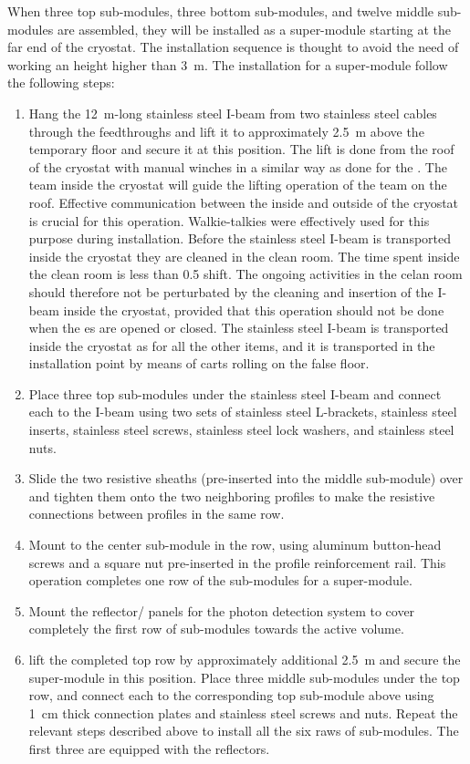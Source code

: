 When three top sub-modules, three bottom sub-modules, and twelve middle sub-modules are assembled, they will be installed as a super-module starting at the far end of the cryostat.
The installation sequence is thought to avoid the need of working an height higher than 3~m.
The installation for a super-module follow the following steps:
\begin{enumerate}
\item Hang the 12~m-long stainless steel I-beam from two stainless steel cables through the feedthroughs and lift it to approximately 2.5~m above the temporary floor and secure it at this position.
The lift is done from the roof of the cryostat with manual winches in a similar way as done for the .
The team inside the cryostat will guide the lifting operation of the team on the roof.
Effective communication between the inside and outside of the cryostat is crucial for this operation.
Walkie-talkies were effectively used for this purpose during  installation.
Before the stainless steel I-beam is transported inside the cryostat they are cleaned in the clean room.
The time spent inside the clean room is less than 0.5 shift.
The ongoing activities in the celan room should therefore not be perturbated by the cleaning and insertion of the I-beam inside the cryostat, provided that this operation should not be done when the  \coldbox{}es are opened or closed.
The stainless steel I-beam is transported inside the cryostat as for all the other items, and it is transported in the installation point by means of carts rolling on the false floor.
\item Place three top sub-modules under the stainless steel I-beam and connect each to the I-beam using two sets of stainless steel L-brackets, stainless steel inserts, stainless steel screws, stainless steel lock washers, and stainless steel nuts.
\item Slide the two resistive sheaths (pre-inserted into the middle sub-module) over and tighten them onto the two neighboring profiles to make the resistive connections between profiles in the same row.
\item Mount  to the center sub-module in the row, using aluminum button-head screws and a square nut pre-inserted in the profile reinforcement rail.
This operation completes one row of the sub-modules for a super-module.
\item Mount the reflector/ panels for the photon detection system to cover completely the first row of sub-modules towards the active volume.
\item lift the completed top row by approximately additional 2.5~m and secure the super-module in this position.
Place three middle sub-modules under the top row, and connect each to the corresponding top sub-module above using 1~cm thick connection plates and stainless steel screws and nuts.
Repeat the relevant steps described above to install all the six raws of sub-modules.
The first three are equipped with the reflectors.
\end{enumerate}

